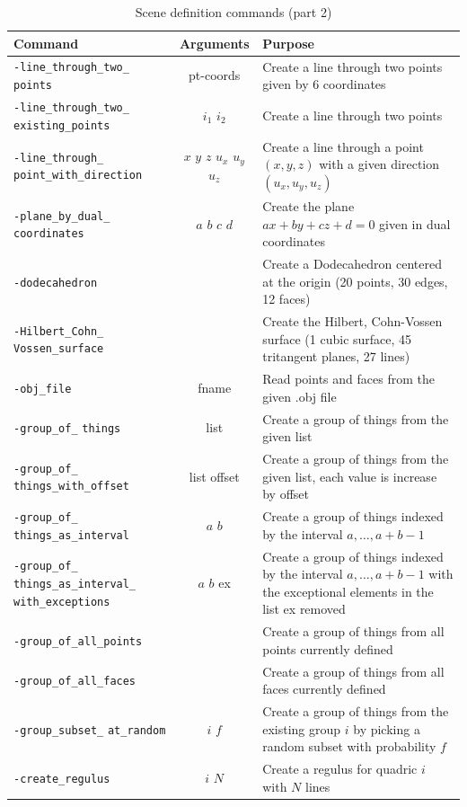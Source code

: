 	\begin{table}
	\begin{center}
	\begin{tabular}{|p{4.5cm}|c|p{8cm}|}
		\hline
		Command & Arguments & Purpose \\
		\hline
		\hline
		\verb'-line_through_two_' \verb'points' & pt-coords   & Create a line through two points given by 6 coordinates \\
		\hline
		\verb'-line_through_two_' \verb'existing_points' & $i_1$ $i_2$   & Create a line through two points \\
		\hline
		\verb'-line_through_' \verb'point_with_direction' & $x$ $y$ $z$ $u_x$ $u_y$ $u_z$   & Create a line through a point $(x,y,z)$ with a given direction $(u_x,u_y,u_z)$ \\
		\hline
		\verb'-plane_by_dual_' \verb'coordinates' & $a$ $b$ $c$ $d$   & Create the plane $ax+by+cz+d=0$ given in dual coordinates \\
		\hline
		\verb'-dodecahedron' &    & Create a Dodecahedron centered at the origin (20 points, 30 edges, 12 faces) \\
		\hline
		\verb'-Hilbert_Cohn_' \verb'Vossen_surface' &    & Create the Hilbert, Cohn-Vossen surface (1 cubic surface, 45 tritangent planes, 27 lines) \\
		\hline
		\verb'-obj_file' &  fname  & Read points and faces from the given .obj file \\
		\hline
		\verb'-group_of_' \verb'things' &  list  & Create a group of things from the given list \\
		\hline
		\verb'-group_of_' \verb'things_with_offset' &  list offset & Create a group of things from the given list, each value is increase by offset \\
		\hline
		\verb'-group_of_' \verb'things_as_interval' &  $a$ $b$ & Create a group of things indexed by the interval $a, \ldots, a+b -1$ \\
		\hline
		\verb'-group_of_' \verb'things_as_interval_' \verb'with_exceptions' &  $a$ $b$ ex & Create a group of things indexed by the interval $a, \ldots, a+b -1$ with the exceptional elements in the list ex removed\\
		\hline
		\verb'-group_of_all_points' &   & Create a group of things from all points currently defined\\
		\hline
		\verb'-group_of_all_faces' &   & Create a group of things from all faces currently defined\\
		\hline
		\verb'-group_subset_' \verb'at_random' & $i$ $f$  & Create a group of things from the existing group $i$ by picking a random subset with probability $f$ \\
		\hline
		\verb'-create_regulus' & $i$ $N$  & Create a regulus for quadric $i$ with $N$ lines \\
		\hline
		\end{tabular}
	\end{center}
	\caption{\label{tab:scene2}Scene definition commands (part 2)}
	\end{table}
